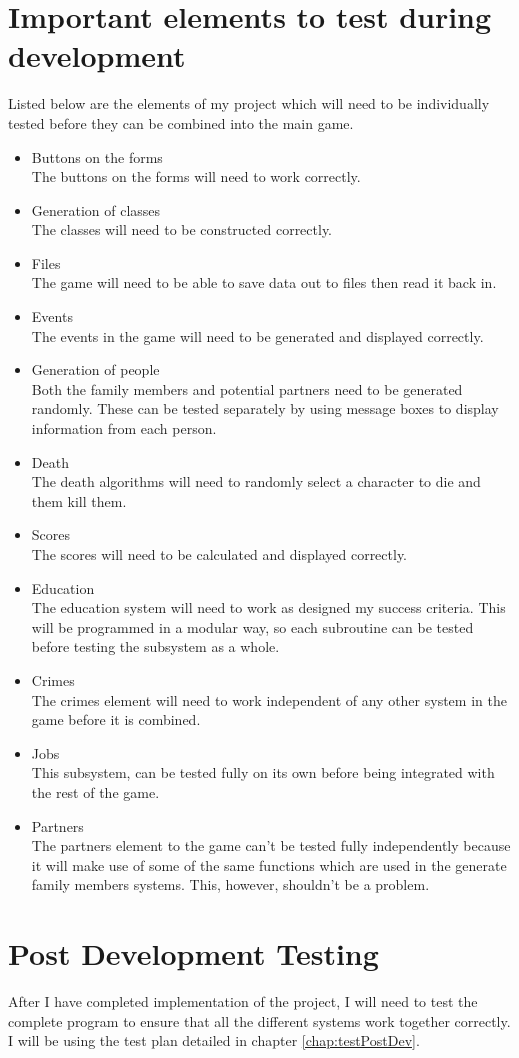 \section{Important elements to test during development}
Listed below are the elements of my project which will need to be individually tested before they can be combined into the main game.
\begin{itemize}
    \item Buttons on the forms\\
    The buttons on the forms will need to work correctly.
    \item Generation of classes\\
    The classes will need to be constructed correctly.
    \item Files\\
    The game will need to be able to save data out to files then read it back in.
    \item Events\\
    The events in the game will need to be generated and displayed correctly.
    \item Generation of people\\
    Both the family members and potential partners need to be generated randomly. These can be tested separately by using message boxes to display information from each person.
    \item Death\\
    The death algorithms will need to randomly select a character to die and them kill them.
    \item Scores \\
    The scores will need to be calculated and displayed correctly.
    \item Education\\
    The education system will need to work as designed my success criteria. This will be programmed in a modular way, so each subroutine can be tested before testing the subsystem as a whole.
    \item Crimes\\
    The crimes element will need to work independent of any other system in the game before it is combined.
    \item Jobs\\
    This subsystem, can be tested fully on its own before being integrated with the rest of the game.
    \item Partners\\
    The partners element to the game can't be tested fully independently because it will make use of some of the same functions which are used in the generate family members systems. This, however, shouldn't be a problem.
\end{itemize}

\section{Post Development Testing}
After I have completed implementation of the project, I will need to test the complete program to ensure that all the different systems work together correctly. I will be using the test plan detailed in chapter \ref{chap:testPostDev}. 